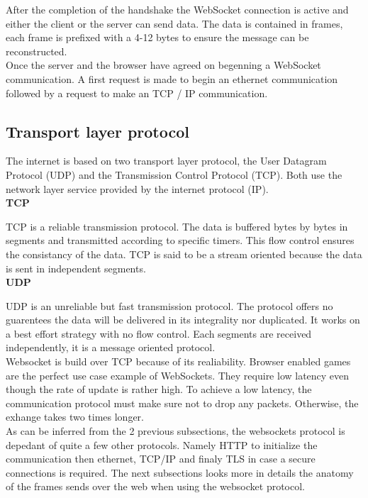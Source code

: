 After the completion of the handshake the WebSocket connection is active and either the client or the server can send data. The data is contained in frames, each frame is prefixed with a 4-12 bytes to ensure the message can be reconstructed. \\
Once the server and the browser have agreed on begenning a WebSocket communication. A first request is made to begin an ethernet communication followed by a request to make an TCP / IP communication.\\

\subsection{Transport layer protocol }

The internet is based on two transport layer protocol, the User Datagram Protocol (UDP) and the Transmission Control Protocol (TCP). Both use the network layer service provided by the internet protocol (IP). \\

\textbf{TCP}

TCP is a reliable transmission protocol. The data is buffered bytes by bytes in segments and transmitted according to specific timers. This flow control ensures the consistancy of the data. TCP is said to be a stream oriented because the data is sent in independent segments.\\

\textbf{UDP}

UDP is an unreliable but fast transmission protocol. The protocol offers no guarentees the data will be delivered in its integrality nor duplicated. It works on a best effort strategy with no flow control. Each segments are received independently, it is a message oriented protocol.\\

Websocket is build over TCP because of its realiability. Browser enabled games are the perfect use case example of WebSockets. They require low latency even though the rate of update is rather high. To achieve a low latency, the communication protocol must make sure not to drop any packets. Otherwise, the exhange takes two times longer.\\
As can be inferred from the 2 previous subsections, the websockets protocol is depedant of quite a few other protocols. Namely HTTP to initialize the communication then ethernet, TCP/IP and finaly  TLS in case a secure connections is required. The next subsections looks more in details the anatomy of the frames sends over the web when using the websocket protocol.\\

